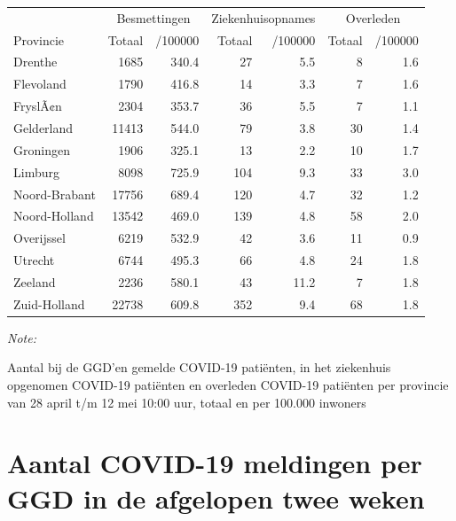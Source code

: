 \documentclass[
  english,
  man,floatsintext]{apa6}
\begin{document}
\begin{table}
\centering
\begin{threeparttable}
\begin{tabular}{lrrrrrr}
\toprule
\multicolumn{1}{c}{ } & \multicolumn{2}{c}{Besmettingen} & \multicolumn{2}{c}{Ziekenhuisopnames} & \multicolumn{2}{c}{Overleden} \\
\cmidrule(l{3pt}r{3pt}){2-3} \cmidrule(l{3pt}r{3pt}){4-5} \cmidrule(l{3pt}r{3pt}){6-7}
Provincie & Totaal & /100000 & Totaal & /100000 & Totaal & /100000\\
\midrule
Drenthe & 1685 & 340.4 & 27 & 5.5 & 8 & 1.6\\
Flevoland & 1790 & 416.8 & 14 & 3.3 & 7 & 1.6\\
FryslÃ¢n & 2304 & 353.7 & 36 & 5.5 & 7 & 1.1\\
Gelderland & 11413 & 544.0 & 79 & 3.8 & 30 & 1.4\\
Groningen & 1906 & 325.1 & 13 & 2.2 & 10 & 1.7\\
Limburg & 8098 & 725.9 & 104 & 9.3 & 33 & 3.0\\
Noord-Brabant & 17756 & 689.4 & 120 & 4.7 & 32 & 1.2\\
Noord-Holland & 13542 & 469.0 & 139 & 4.8 & 58 & 2.0\\
Overijssel & 6219 & 532.9 & 42 & 3.6 & 11 & 0.9\\
Utrecht & 6744 & 495.3 & 66 & 4.8 & 24 & 1.8\\
Zeeland & 2236 & 580.1 & 43 & 11.2 & 7 & 1.8\\
Zuid-Holland & 22738 & 609.8 & 352 & 9.4 & 68 & 1.8\\
\bottomrule
\end{tabular}
\begin{tablenotes}
\item \textit{Note: } 
\item Aantal bij de GGD’en gemelde COVID-19 patiënten, in het ziekenhuis opgenomen COVID-19 patiënten en overleden COVID-19 patiënten per provincie van 28 april t/m 12 mei 10:00 uur, totaal en per 100.000 inwoners
\end{tablenotes}
\end{threeparttable}
\end{table}

\newpage

\hypertarget{aantal-covid-19-meldingen-per-ggd-in-de-afgelopen-twee-weken}{%
\section{Aantal COVID-19 meldingen per GGD in de afgelopen twee weken}\label{aantal-covid-19-meldingen-per-ggd-in-de-afgelopen-twee-weken}}
\end{document}
